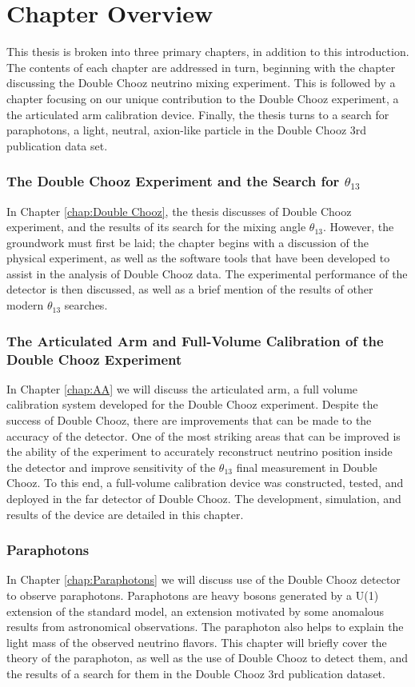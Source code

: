 \section{Chapter Overview}
This thesis is broken into three primary chapters, in addition to this introduction. The contents of each chapter are addressed in turn, beginning with the chapter discussing the Double Chooz neutrino mixing experiment. This is followed by a chapter focusing on our unique contribution to the Double Chooz experiment, a the articulated arm calibration device. Finally, the thesis turns to a search for paraphotons, a light, neutral, axion-like particle in the Double Chooz 3rd publication data set. 

\subsubsection{The Double Chooz Experiment and the Search for $\theta_{13}$}
In Chapter \ref{chap:Double Chooz}, the thesis discusses of Double Chooz experiment, and the results of its search for the mixing angle $\theta_{13}$. However, the groundwork must first be laid; the chapter begins with a discussion of the physical experiment, as well as the software tools that have been developed to assist in the analysis of Double Chooz data. The experimental performance of the detector is then discussed, as well as a brief mention of the results of other modern $\theta_{13}$ searches. 


\subsubsection{The Articulated Arm and Full-Volume Calibration of the Double Chooz Experiment}
In Chapter \ref{chap:AA} we will discuss the articulated arm, a full volume calibration system developed for the Double Chooz experiment. Despite the success of Double Chooz, there are improvements that can be made to the accuracy of the detector. One of the most striking areas that can be improved is the ability of the experiment to accurately reconstruct neutrino position inside the detector and improve sensitivity of the $\theta_{13}$ final measurement in Double Chooz. To this end, a full-volume calibration device was constructed, tested, and deployed in the far detector of Double Chooz. The development, simulation, and results of the device are detailed in this chapter. 


\subsubsection{Paraphotons}
In Chapter \ref{chap:Paraphotons} we will discuss use of the Double Chooz detector to observe paraphotons. Paraphotons are heavy bosons generated by a U(1) extension of the standard model, an extension motivated by some anomalous results from astronomical observations. The paraphoton also helps to explain the light mass of the observed neutrino flavors. This chapter will briefly cover the theory of the paraphoton, as well as the use of Double Chooz to detect them, and the results of a search for them in the Double Chooz 3rd publication dataset. 